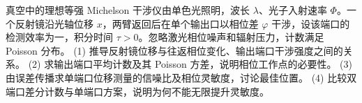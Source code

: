 真空中的理想等强 Michelson 干涉仪由单色光照明，波长 \(\lambda\)、光子入射速率 \(\Phi\)。一个反射镜沿光轴位移 \(x\)，两臂返回后在单个输出口以相位差 \(\varphi\) 干涉，设该端口的检测效率为一，积分时间 \(\tau>0\)。忽略激光相位噪声和辐射压力，计数满足 Poisson 分布。
(1) 推导反射镜位移与往返相位变化、输出端口干涉强度之间的关系。
(2) 求输出端口平均计数及其 Poisson 方差，说明相位工作点的必要性。
(3) 由误差传播求单端口位移测量的信噪比及相位灵敏度，讨论最佳位置。
(4) 比较双端口差分计数与单端口方案，说明为何不能无限提升灵敏度。
